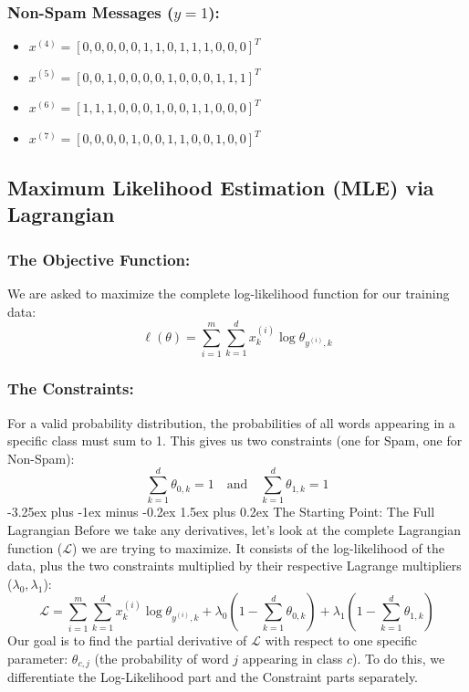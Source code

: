 \documentclass[twoside, 10pt]{article}
\makeatletter
\renewcommand{\paragraph}{\@startsection{paragraph}{4}{0pt}%
    {-3.25ex plus -1ex minus -0.2ex}%
    {1.5ex plus 0.2ex}%
    {\normalfont\normalsize\bfseries}}
\makeatother
\begin{document}
\subsubsection*{Non-Spam Messages ($y=1$):}
\begin{itemize}
    \item $x^{(4)} = [0, 0, 0, 0, 0, 1, 1, 0, 1, 1, 1, 0, 0, 0]^T$
    \item $x^{(5)} = [0, 0, 1, 0, 0, 0, 0, 1, 0, 0, 0, 1, 1, 1]^T$
    \item $x^{(6)} = [1, 1, 1, 0, 0, 0, 1, 0, 0, 1, 1, 0, 0, 0]^T$
    \item $x^{(7)} = [0, 0, 0, 0, 1, 0, 0, 1, 1, 0, 0, 1, 0, 0]^T$
\end{itemize}
\subsection{Maximum Likelihood Estimation (MLE) via Lagrangian}
\subsubsection{The Objective Function:}
We are asked to maximize the complete log-likelihood function for our training data:
\[
\ell(\theta) = \sum_{i=1}^{m} \sum_{k=1}^{d} x_k^{(i)} \log \theta_{y^{(i)},k}
\]
\subsubsection{The Constraints:}
For a valid probability distribution, the probabilities of all words appearing in a specific class must sum to 1. This gives us two constraints (one for Spam, one for Non-Spam):
\[
\sum_{k=1}^{d} \theta_{0,k} = 1 \quad \text{and} \quad \sum_{k=1}^{d} \theta_{1,k} = 1
\]
\paragraph{The Starting Point: The Full Lagrangian}
Before we take any derivatives, let's look at the complete Lagrangian function ($\mathcal{L}$) we are trying to maximize. It consists of the log-likelihood of the data, plus the two constraints multiplied by their respective Lagrange multipliers ($\lambda_0, \lambda_1$):
\[
\mathcal{L} = \sum_{i=1}^{m} \sum_{k=1}^{d} x_k^{(i)} \log \theta_{y^{(i)},k} + \lambda_0 \left(1 - \sum_{k=1}^{d} \theta_{0,k}\right) + \lambda_1 \left(1 - \sum_{k=1}^{d} \theta_{1,k}\right)
\]
Our goal is to find the partial derivative of $\mathcal{L}$ with respect to one specific parameter: $\theta_{c,j}$ (the probability of word $j$ appearing in class $c$). To do this, we differentiate the Log-Likelihood part and the Constraint parts separately.
\end{document}

